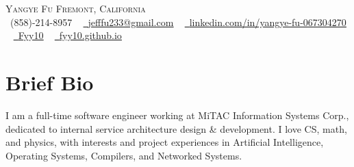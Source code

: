 \documentclass[letterpaper,11pt]{article}
\begin{document}

\begin{center}
    {\Huge \scshape Yangye Fu \upshape\small\faMapMarker* Fremont, California} \\ \vspace{1pt}
    \small \raisebox{-0.1\height}\faPhone\ (858)-214-8957 ~
    \href{mailto:jefffu233@gmail.com}{\raisebox{-0.2\height}\faEnvelope\ \underline{jefffu233@gmail.com}} ~
    \href{https://www.linkedin.com/in/yangye-fu-067304270/}{\raisebox{-0.2\height}\faLinkedin\ \underline{linkedin.com/in/yangye-fu-067304270}} ~
    \href{https://github.com/Fyy10}{\raisebox{-0.2\height}\faGithub\ \underline{Fyy10}} ~
    \href{https://fyy10.github.io}{\raisebox{-0.2\height}\faHome\ \underline{fyy10.github.io}}
    \vspace{-8pt}
\end{center}

\section{Brief Bio}
I am a full-time software engineer working at MiTAC Information Systems Corp., dedicated to internal service architecture design \& development.
I love CS, math, and physics, with interests and project experiences in Artificial Intelligence, Operating Systems, Compilers, and Networked Systems.
\vspace{-8pt}


\end{document}
